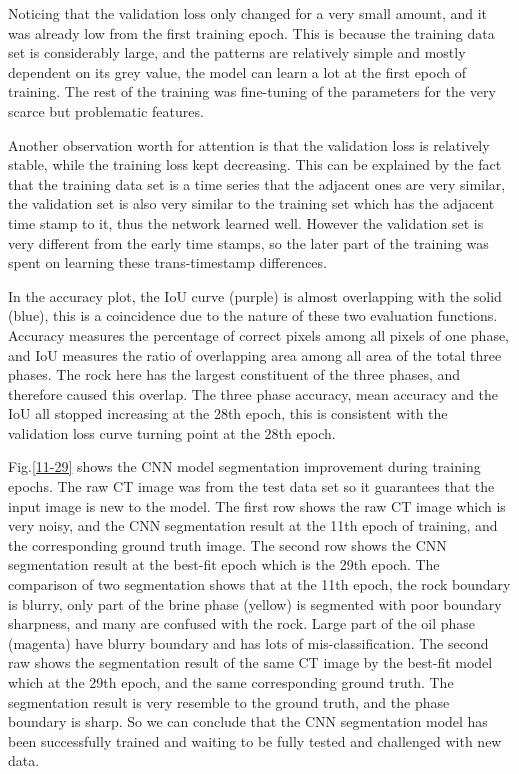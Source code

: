 Noticing that the validation loss only changed for a very small amount, and it was already low from the first training epoch. This is because the training data set is considerably large, and the patterns are relatively simple and mostly dependent on its grey value, the model can learn a lot at the first epoch of training. The rest of the training was fine-tuning of the parameters for the very scarce but problematic features.

Another observation worth for attention is that the validation loss is relatively stable, while the training loss kept decreasing. This can be explained by the fact that the training data set is a time series that the adjacent ones are very similar, the validation set is also very similar to the training set which has the adjacent time stamp to it, thus the network learned well. However the validation set is very different from the early time stamps, so the later part of the training was spent on learning these trans-timestamp differences.

In the accuracy plot, the IoU curve (purple) is almost overlapping with the solid (blue), this is a coincidence due to the nature of these two evaluation functions. Accuracy measures the percentage of correct pixels among all pixels of one phase, and IoU measures the ratio of overlapping area among all area of the total three phases. The rock here has the largest constituent of the three phases, and therefore caused this overlap. The three phase accuracy, mean accuracy and the IoU all stopped increasing at the 28th epoch, this is consistent with the validation loss curve turning point at the 28th epoch.

Fig.\ref{11-29} shows the CNN model segmentation improvement during training epochs. The raw CT image was from the test data set so it guarantees that the input image is new to the model. The first row shows the raw CT image which is very noisy, and the CNN segmentation result at the 11th epoch of training, and the corresponding ground truth image. The second row shows the CNN segmentation result at the best-fit epoch which is the 29th epoch. The comparison of two segmentation shows that at the 11th epoch, the rock boundary is blurry, only part of the brine phase (yellow) is segmented with poor boundary sharpness, and many are confused with the rock. Large part of the oil phase (magenta) have blurry boundary and has lots of mis-classification. The second raw shows the segmentation result of the same CT image by the best-fit model which at the 29th epoch, and the same corresponding ground truth. The segmentation result is very resemble to the ground truth, and the phase boundary is sharp. So we can conclude that the CNN segmentation model has been successfully trained and waiting to be fully tested and challenged with new data.

